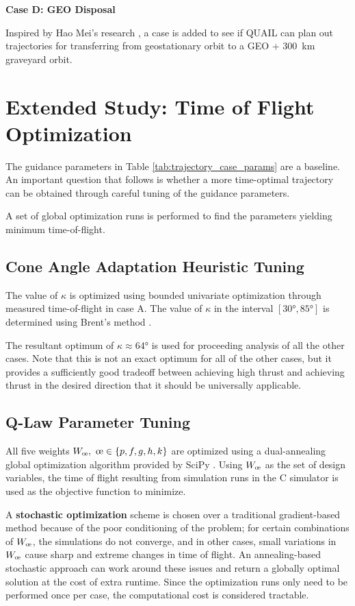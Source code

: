 \textbf{Case D: GEO Disposal}

Inspired by Hao Mei's research \cite{mei2020hybrid}, a case is added to see if QUAIL can plan out trajectories for transferring from geostationary orbit to a GEO + \qty{300}{km} graveyard orbit.

\section{Extended Study: Time of Flight Optimization}
The guidance parameters in Table \ref{tab:trajectory_case_params} are a baseline. An important question that follows is whether a more time-optimal trajectory can be obtained through careful tuning of the guidance parameters.

A set of global optimization runs is performed to find the parameters yielding minimum time-of-flight.

\subsection{Cone Angle Adaptation Heuristic Tuning}
The value of \(\kappa\) is optimized using bounded univariate optimization through measured time-of-flight in case A. The value of \(\kappa\) in the interval \([\ang{30}, \ang{85}]\) is determined using Brent's method \cite{brent2013algorithms}.

The resultant optimum of \(\kappa \approx \ang{64}\) is used for proceeding analysis of all the other cases. Note that this is not an exact optimum for all of the other cases, but it provides a sufficiently good tradeoff between achieving high thrust and achieving thrust in the desired direction that it should be universally applicable.

\subsection{Q-Law Parameter Tuning}
All five weights \(W_{\moe}, \ \moe \in \{p, f, g, h, k\}\) are optimized using a dual-annealing global optimization algorithm provided by SciPy \cite{2020SciPy-NMeth}. Using \(W_\moe\) as the set of design variables, the time of flight resulting from simulation runs in the C simulator is used as the objective function to minimize.

A \textbf{stochastic optimization} scheme is chosen over a traditional gradient-based method because of the poor conditioning of the problem; for certain combinations of \(W_\moe\), the simulations do not converge, and in other cases, small variations in \(W_\moe\) cause sharp and extreme changes in time of flight. An annealing-based stochastic approach can work around these issues and return a globally optimal solution at the cost of extra runtime. Since the optimization runs only need to be performed once per case, the computational cost is considered tractable.

